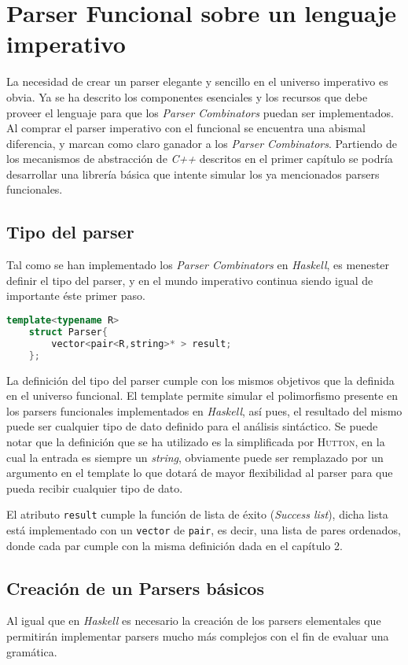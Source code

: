 \section{Parser Funcional sobre un lenguaje imperativo}

La necesidad de crear un parser elegante y sencillo en el universo imperativo es obvia. Ya se ha descrito los componentes esenciales y los recursos que debe proveer el lenguaje para que los \emph{Parser Combinators} puedan ser implementados. Al comprar el parser imperativo con el funcional se encuentra una abismal diferencia, y marcan como claro ganador a los  \emph{Parser Combinators}. Partiendo de los mecanismos de abstracción de \emph{C++} descritos en el primer capítulo se podría desarrollar una librería básica que intente simular los ya mencionados parsers funcionales.

	\subsection{Tipo del parser}
	Tal como se han implementado los \emph{Parser Combinators} en \emph{Haskell}, es menester definir el tipo del parser, y en el mundo imperativo continua siendo igual de importante éste primer paso.
	
	\begin{lstlisting}[language=C++, caption=Tipo Parser]
	template<typename R>
	struct Parser{
		vector<pair<R,string>* > result;		
	};
	\end{lstlisting}

	La definición del tipo del parser cumple con los mismos objetivos que la definida en el universo funcional. El template permite simular el polimorfismo presente en los parsers funcionales implementados en \emph{Haskell}, así pues, el resultado del mismo puede ser cualquier tipo de dato definido para el análisis sintáctico. 
	Se puede notar que la definición que se ha utilizado es la simplificada por \textsc{Hutton}, en la cual la entrada es siempre un \emph{string}, obviamente puede ser remplazado por un argumento en el template lo que dotará de mayor flexibilidad al parser para que pueda recibir cualquier tipo de dato.
	
	El atributo \texttt{result} cumple la función de lista de éxito (\emph{Success list}), dicha lista está implementado con un \texttt{vector} de \texttt{pair}, es decir, una lista de pares ordenados, donde cada par cumple con la misma definición dada en el capítulo 2.
	
	\subsection{Creación de un Parsers básicos}
	Al igual que en \emph{Haskell} es necesario la creación de los parsers elementales que permitirán implementar parsers mucho más complejos con el fin de evaluar una gramática.
	

